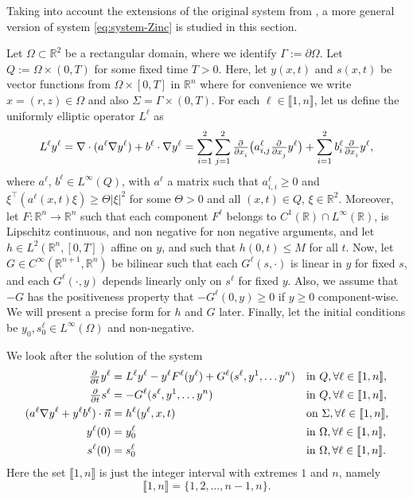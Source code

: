 \documentclass[11pt]{article}
\newcommand{\R}{\mathbb{R}}
\newcommand{\llb}{\llbracket}
\newcommand{\rrb}{\rrbracket}
\numberwithin{equation}{section}
\begin{document}
Taking into account the extensions of the original system from \cite{Ptashnyk-2011}, a more general version of system \eqref{eq:system-Zinc} is studied in this section. 

Let \(\Omega \subset \R^2\) be a rectangular domain, where we identify \(\Gamma := \partial \Omega\). Let \( Q := \Omega \times (0,T)\) for some fixed time \(T >0\).
Here, let \(y(x,t)\) and \(s(x,t)\) be vector functions from \(\Omega \times [0,T]\) in \(\R^{n}\) where for convenience we write \( x = (r,z) \in \Omega\) and also \(\Sigma = \Gamma \times (0,T)\). For each \(\ell \in \llb1,n\rrb\), let us define the uniformly elliptic operator \(L^\ell\) as
\[
	L^\ell y^\ell = \nabla \cdot (a^\ell \nabla y^\ell) + b^\ell \cdot \nabla y^\ell
	= \sum_{i=1}^{2}  \sum_{j=1}^2 \pd{ }{x_i} \big( a_{i,j}^\ell \pd{ }{x_j} y^\ell \big) + \sum_{i=1}^2 b_i^\ell \pd{ }{x_i} y^\ell,
\]
where \(a^\ell\), \(b^\ell \in L^\infty (Q)\), with \(a^\ell\) a matrix such that \(a^\ell_{i,i} \geq 0\) and
\(
	\xi^\top (a^\ell (x,t) \xi) \geq \Theta |\xi|^2
\)
for some \(\Theta > 0\) and all \((x,t) \in Q\), \( \xi \in \R^2\).
%
Moreover, let \(F: \R^n \to \R^n\) such that each component \( F^\ell \) belongs to \( C^1 (\R) \cap L^\infty (\R)\), is Lipschitz continuous, and non negative for non negative arguments, and let \(h\in L^2 (\R^n,[0,T]) \) affine on \(y\), and such that \(h(0,t) \leq M \) for all \(t\).
Now, let \(G \in C^\infty(\R^{n+1}, \R^n)\) be bilinear such that each \( G^\ell(s,\cdot)\) is linear in \( y\) for fixed \(s\), and each \( G^\ell (\cdot, y)\) depends linearly only on \( s^\ell\) for fixed \(y\). Also, we assume that \(-G\) has the positiveness property that \(-G^\ell (0, y) \geq 0\) if \( y\geq 0\) component-wise. We will present a precise form for \(h\) and \(G\) later.
Finally, let the initial conditions be \( y_0, s_0^\ell \in L^\infty (\Omega)\) and non-negative.

We look after the solution of the system
\begin{subequations}
\label{eq:pde-ode-sys-a}
\begin{align}
	\pd{ }{t} y^\ell &= L^\ell y^\ell - y^\ell F^\ell(y^\ell) + G^\ell(s^\ell,y^1,\ldots y^n) 		&& \text{in } Q, \forall \ell \in \llb 1,n\rrb,
	\\
	\label{sys:coupled-ode}
	\pd{ }{t} s^\ell &= -G^\ell(s^\ell,y^1,\ldots y^n)				&& \text{in } Q,\forall \ell \in \llb 1,n\rrb,
	\\
	 (a^\ell \nabla y^\ell + y^\ell b^\ell) \cdot \vec{n} &= h^\ell (y^\ell, x,t)	&& \text{on } \Sigma,\forall \ell \in \llb 1,n\rrb,
	 \label{eq:1.2.d}
	 \\
	 y^\ell(0) &= y^\ell_{0}			 && \text{in } \Omega, \forall \ell \in \llb 1,n\rrb,
	 \\
	 s^\ell(0) &= s^\ell_{0}			 && \text{in } \Omega, \forall \ell \in \llb 1,n\rrb.
\end{align}
\end{subequations}
Here the set \( \llb 1,n\rrb\) is just the integer interval with extremes \(1\) and \(n\), namely
\[
	\llb 1,n\rrb = \{1,2,\ldots, n-1, n\}.
\]
\end{document}
